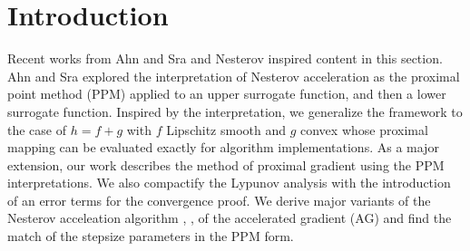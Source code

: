 \documentclass[12pt]{article}
\begin{document}
\section{Introduction}
    Recent works from Ahn and Sra \cite{ahn_understanding_2022} and Nesterov \cite{nesterov_lectures_2018} inspired content in this section.
    Ahn and Sra explored the interpretation of Nesterov acceleration as the proximal point method (PPM) applied to an upper surrogate function, and then a lower surrogate function. 
    Inspired by the interpretation, we generalize the framework to the case of $h = f + g$ with $f$ Lipschitz smooth and $g$ convex whose proximal mapping can be evaluated exactly for algorithm implementations. 
    As a major extension, our work describes the method of proximal gradient using the PPM interpretations. We also compactify the Lypunov analysis with the introduction of an error terms for the convergence proof. We derive major variants of the Nesterov acceleation algorithm
    \cite{chambolle_convergence_2015}, \cite{beck_fast_2009-1}, \cite[Chapter 12]{ryu_large-scale_2022}
    of the accelerated gradient (AG) and find the match of the stepsize parameters in the PPM form. 
\end{document}
